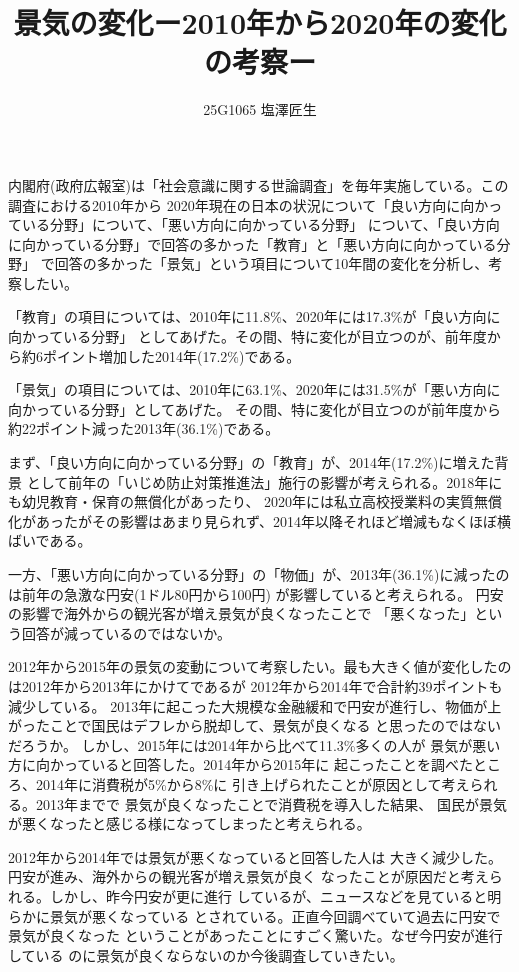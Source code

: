 \documentclass[uplatex,dvipdfmx]{jsarticle}
\begin{document}
\title{景気の変化ー2010年から2020年の変化の考察ー}
\author{25G1065 塩澤匠生}
\maketitle

内閣府(政府広報室)は「社会意識に関する世論調査」を毎年実施している。この調査における2010年から
2020年現在の日本の状況について「良い方向に向かっている分野」について、「悪い方向に向かっている分野」
について、「良い方向に向かっている分野」で回答の多かった「教育」と「悪い方向に向かっている分野」
で回答の多かった「景気」という項目について10年間の変化を分析し、考察したい。

「教育」の項目については、2010年に11.8\%、2020年には17.3\%が「良い方向に向かっている分野」
としてあげた。その間、特に変化が目立つのが、前年度から約6ポイント増加した2014年(17.2\%)である。

「景気」の項目については、2010年に63.1\%、2020年には31.5\%が「悪い方向に向かっている分野」としてあげた。
その間、特に変化が目立つのが前年度から約22ポイント減った2013年(36.1\%)である。

まず、「良い方向に向かっている分野」の「教育」が、2014年(17.2\%)に増えた背景
として前年の「いじめ防止対策推進法」施行の影響が考えられる\cite{ijime}。2018年にも幼児教育・保育の無償化があったり、
2020年には私立高校授業料の実質無償化があったがその影響はあまり見られず、2014年以降それほど増減もなくほぼ横ばいである。

一方、「悪い方向に向かっている分野」の「物価」が、2013年(36.1\%)に減ったのは前年の急激な円安(1ドル80円から100円)
が影響していると考えられる\cite{ennyasu}。
円安の影響で海外からの観光客が増え景気が良くなったこと\cite{ennyasu2}で
「悪くなった」という回答が減っているのではないか。

2012年から2015年の景気の変動について考察したい。最も大きく値が変化したのは2012年から2013年にかけてであるが
2012年から2014年で合計約39ポイントも減少している。
2013年に起こった大規模な金融緩和で円安が進行し、物価が上がったことで国民はデフレから脱却して、景気が良くなる
と思ったのではないだろうか。
しかし、2015年には2014年から比べて11.3\%多くの人が
景気が悪い方に向かっていると回答した。2014年から2015年に
起こったことを調べたところ、2014年に消費税が5\%から8\%に
引き上げられたことが原因として考えられる。2013年までで
景気が良くなったことで消費税を導入した結果、
国民が景気が悪くなったと感じる様になってしまったと考えられる。

2012年から2014年では景気が悪くなっていると回答した人は
大きく減少した。円安が進み、海外からの観光客が増え景気が良く
なったことが原因だと考えられる。しかし、昨今円安が更に進行
しているが、ニュースなどを見ていると明らかに景気が悪くなっている
とされている。正直今回調べていて過去に円安で景気が良くなった
ということがあったことにすごく驚いた。なぜ今円安が進行している
のに景気が良くならないのか今後調査していきたい。
\end{document}
